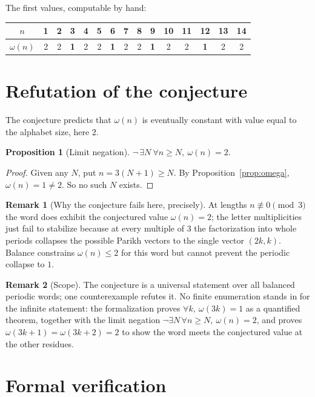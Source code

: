\documentclass[11pt]{article}
\newtheorem{proposition}{Proposition}
\theoremstyle{definition}
\newtheorem{remark}{Remark}
\begin{document}
The first values, computable by hand:
\begin{center}
\begin{tabular}{c|cccccccccccccc}
$n$      & 1 & 2 & 3 & 4 & 5 & 6 & 7 & 8 & 9 & 10 & 11 & 12 & 13 & 14 \\
\hline
$\omega(n)$ & 2 & 2 & \textbf{1} & 2 & 2 & \textbf{1} & 2 & 2 & \textbf{1} & 2 & 2 & \textbf{1} & 2 & 2
\end{tabular}
\end{center}

\section{Refutation of the conjecture}

The conjecture predicts that $\omega(n)$ is eventually constant with value equal
to the alphabet size, here $2$.

\begin{proposition}[Limit negation]\label{prop:main}
$\neg\,\exists N\ \forall n \ge N,\ \omega(n) = 2.$
\end{proposition}
\begin{proof}
Given any $N$, put $n = 3(N+1) \ge N$. By Proposition~\ref{prop:omega},
$\omega(n) = 1 \neq 2$. So no such $N$ exists.
\end{proof}

\begin{remark}[Why the conjecture fails here, precisely]
At lengths $n \not\equiv 0 \pmod 3$ the word does exhibit the conjectured value
$\omega(n) = 2$; the letter multiplicities just fail to stabilize because at
every multiple of $3$ the factorization into whole periods collapses the
possible Parikh vectors to the single vector $(2k, k)$. Balance constrains
$\omega(n) \le 2$ for this word but cannot prevent the periodic collapse to
$1$.
\end{remark}

\begin{remark}[Scope]
The conjecture is a universal statement over all balanced periodic words; one
counterexample refutes it. No finite enumeration stands in for the infinite
statement: the formalization proves $\forall k,\ \omega(3k) = 1$ as a
quantified theorem, together with the limit negation
$\neg\exists N\,\forall n \ge N,\ \omega(n) = 2$, and proves
$\omega(3k+1) = \omega(3k+2) = 2$ to show the word meets the conjectured value
at the other residues.
\end{remark}

\section{Formal verification}
\end{document}
